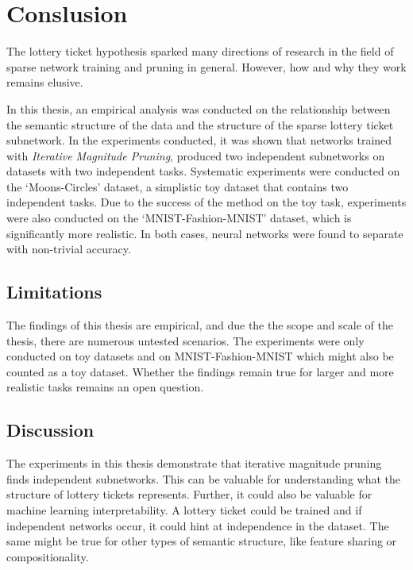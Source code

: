 \chapter{Conslusion}

The lottery ticket hypothesis sparked many directions of research in the field of sparse network training and pruning in general.
However, how and why they work remains elusive.

In this thesis, an empirical analysis was conducted on the relationship between the semantic structure of the data and the structure of the sparse lottery ticket subnetwork.
In the experiments conducted, it was shown that networks trained with \textit{Iterative Magnitude Pruning}, produced two independent subnetworks on datasets with two independent tasks.
Systematic experiments were conducted on the `Moons-Circles' dataset, a simplistic toy dataset that contains two independent tasks.
Due to the success of the method on the toy task, experiments were also conducted on the `MNIST-Fashion-MNIST' dataset, which is significantly more realistic.
In both cases, neural networks were found to separate with non-trivial accuracy.

\section{Limitations}
The findings of this thesis are empirical, and due the the scope and scale of the thesis, there are numerous untested scenarios.
The experiments were only conducted on toy datasets and on MNIST-Fashion-MNIST which might also be counted as a toy dataset.
Whether the findings remain true for larger and more realistic tasks remains an open question.

\section{Discussion}
The experiments in this thesis demonstrate that iterative magnitude pruning finds independent subnetworks.
This can be valuable for understanding what the structure of lottery tickets represents.
Further, it could also be valuable for machine learning interpretability.
A lottery ticket could be trained and if independent networks occur, it could hint at independence in the dataset.
The same might be true for other types of semantic structure, like feature sharing or compositionality.

